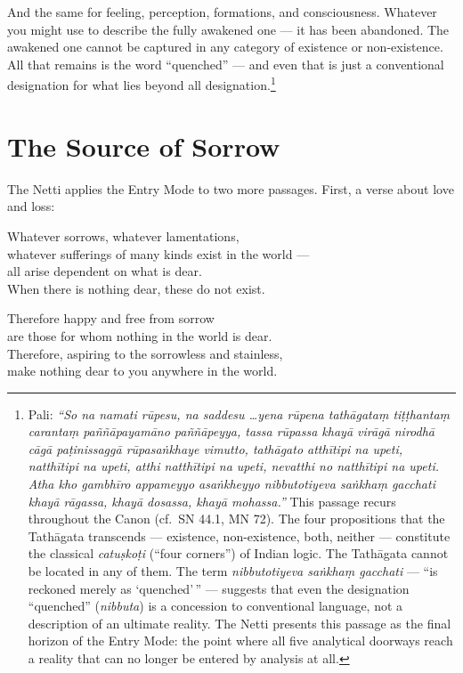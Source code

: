 And the same for feeling, perception, formations, and consciousness. Whatever you might use to describe the fully awakened one --- it has been abandoned. The awakened one cannot be captured in any category of existence or non-existence. All that remains is the word ``quenched'' --- and even that is just a conventional designation for what lies beyond all designation.\footnote{Pali: \textit{``So na namati rūpesu, na saddesu \ldots yena rūpena tathāgataṃ tiṭṭhantaṃ carantaṃ paññāpayamāno paññāpeyya, tassa rūpassa khayā virāgā nirodhā cāgā paṭinissaggā rūpasaṅkhaye vimutto, tathāgato atthītipi na upeti, natthītipi na upeti, atthi natthītipi na upeti, nevatthi no natthītipi na upeti. Atha kho gambhīro appameyyo asaṅkheyyo nibbutotiyeva saṅkhaṃ gacchati khayā rāgassa, khayā dosassa, khayā mohassa.''} This passage recurs throughout the Canon (cf.\ SN 44.1, MN 72). The four propositions that the Tathāgata transcends --- existence, non-existence, both, neither --- constitute the classical \textit{catuṣkoṭi} (``four corners'') of Indian logic. The Tathāgata cannot be located in any of them. The term \textit{nibbutotiyeva saṅkhaṃ gacchati} --- ``is reckoned merely as `quenched'\,'' --- suggests that even the designation ``quenched'' (\textit{nibbuta}) is a concession to conventional language, not a description of an ultimate reality. The Netti presents this passage as the final horizon of the Entry Mode: the point where all five analytical doorways reach a reality that can no longer be entered by analysis at all.}

\section*{The Source of Sorrow}

The Netti applies the Entry Mode to two more passages. First, a verse about love and loss:

\begin{versebox}
Whatever sorrows, whatever lamentations,\\
whatever sufferings of many kinds exist in the world ---\\
all arise dependent on what is dear.\\
When there is nothing dear, these do not exist.

\stanza

Therefore happy and free from sorrow\\
are those for whom nothing in the world is dear.\\
Therefore, aspiring to the sorrowless and stainless,\\
make nothing dear to you anywhere in the world.
\end{versebox}

